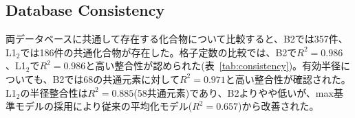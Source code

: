 \documentclass[a4paper,10pt,5p]{elsarticle}
\begin{document}
\begin{table}[htbp]      \small
    \centering
    \caption{B2-L1$_2$ radius contraction statistics by element group (MP data). The ``Avg.'' column shows the mean contraction rate, and ``Range'' shows the minimum to maximum values within each group. Negative values indicate B2 radius smaller than L1$_2$ radius.}
    \label{tab:element_groups}
\end{table}

\subsection{Database Consistency}
両データベースに共通して存在する化合物について比較すると、B2では357件、L1$_2$では186件の共通化合物が存在した。格子定数の比較では、B2で$R^2 = 0.986$、L1$_2$で$R^2 = 0.986$と高い整合性が認められた(表~\ref{tab:consistency})。有効半径についても、B2では68の共通元素に対して$R^2 = 0.971$と高い整合性が確認された。L1$_2$の半径整合性は$R^2 = 0.885$(58共通元素)であり、B2よりやや低いが、max基準モデルの採用により従来の平均化モデル($R^2 = 0.657$)から改善された。

\end{document}
